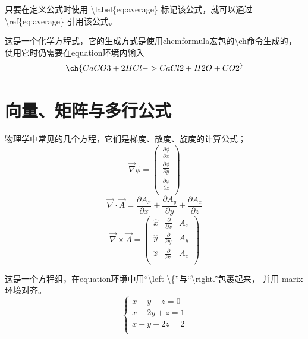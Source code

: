 \documentclass[UTF8]{ctexart}
\begin{document}
	只要在定义公式时使用 \textbackslash label\{eq:average\} 标记该公式，就可以通过 \textbackslash ref\{eq:average\} 引用该公式。

	这是一个化学方程式，它的生成方式是使用chemformula宏包的\textbackslash ch命令生成的，使用它时仍需要在equation环境内输入
	\begin{equation}
		\ch{CaCO3 + 2 HCl -> CaCl2 + H2O + CO2 ^}
	\end{equation}

\section{向量、矩阵与多行公式}
	物理学中常见的几个方程，它们是梯度、散度、旋度的计算公式；
	\begin{equation}
		\vec{\nabla}\phi
		=
		\left(
			\begin{array}{lcr}
				\frac{\partial \phi}{\partial x} \\
				\frac{\partial \phi}{\partial y} \\
				\frac{\partial \phi}{\partial z} \\
			\end{array}
		\right)
	\end{equation}
	\begin{equation}
		\vec{\nabla}\cdot\vec{A} =
			\frac{\partial A_x}{\partial x}+
			\frac{\partial A_y}{\partial y}+
			\frac{\partial A_z}{\partial z}
	\end{equation}
	\begin{equation}
		\vec{\nabla}\times\vec{A} =
		\left(
			\begin{array}{lcr}
				\hat{x} & \frac{\partial}{\partial x} & A_x \\
				\hat{y} & \frac{\partial}{\partial y} & A_y \\
				\hat{z} & \frac{\partial}{\partial z} & A_z \\
			\end{array}
		\right)
	\end{equation}

	这是一个方程组，在equation环境中用“\textbackslash left \textbackslash \{”与“\textbackslash right.”包裹起来，
	并用 marix 环境对齐。
	\begin{equation}
		\left\{
			\begin{matrix}
				x+y+z=0  \\
				x+2y+z=1 \\
				x+y+2z=2 \\
			\end{matrix}
		\right.
	\end{equation}
\end{document}
